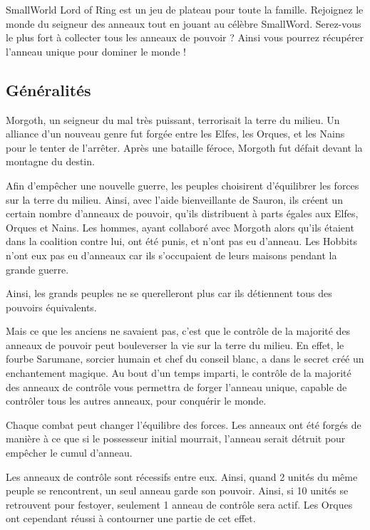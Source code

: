 SmallWorld Lord of Ring est un jeu de plateau pour toute la famille. Rejoignez le monde du seigneur des anneaux tout en jouant au célèbre SmallWord. Serez-vous le plus fort à collecter tous les anneaux de pouvoir ? Ainsi vous pourrez récupérer l'anneau unique pour dominer le monde !

\subsection{Généralités}

Morgoth, un seigneur du mal très puissant, terrorisait la terre du milieu. Un alliance d'un nouveau genre fut forgée entre les Elfes, les Orques, et les Nains pour le tenter de l'arrêter. Après une bataille féroce, Morgoth fut défait devant la montagne du destin.

Afin d'empêcher une nouvelle guerre, les peuples choisirent d'équilibrer les forces sur la terre du milieu. Ainsi, avec l'aide bienveillante de Sauron, ils créent un certain nombre d'anneaux de pouvoir, qu'ils distribuent à parts égales aux Elfes, Orques et Nains. Les hommes, ayant collaboré avec Morgoth alors qu'ils étaient dans la coalition contre lui, ont été punis, et n'ont pas eu d'anneau. Les Hobbits n'ont eux pas eu d'anneaux car ils s'occupaient de leurs maisons pendant la grande guerre.

Ainsi, les grands peuples ne se querelleront plus car ils détiennent tous des pouvoirs équivalents.

Mais ce que les anciens ne savaient pas, c'est que le contrôle de la majorité des anneaux de pouvoir peut bouleverser la vie sur la terre du milieu. En effet, le fourbe Sarumane, sorcier humain et chef du conseil blanc, a dans le secret créé un enchantement magique. Au bout d'un temps imparti, le contrôle de la majorité des anneaux de contrôle vous permettra de forger l'anneau unique, capable de contrôler tous les autres anneaux, pour conquérir le monde.

Chaque combat peut changer l'équilibre des forces. Les anneaux ont été forgés de manière à ce que si le possesseur initial mourrait, l'anneau serait détruit pour empêcher le cumul d'anneau.

Les anneaux de contrôle sont récessifs entre eux. Ainsi, quand 2 unités du même peuple se rencontrent, un seul anneau garde son pouvoir. Ainsi, si 10 unités se retrouvent pour festoyer, seulement 1 anneau de contrôle sera actif. Les Orques ont cependant réussi à contourner une partie de cet effet.

